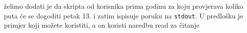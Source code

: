 \documentclass{exam}
\newcommand{\shell}[1]{\texttt{#1}}
\begin{document}
\begin{itemize}
                                                                        želimo
                                                                        dodati
                                                                        je da
                                                                        skripta
                                                                        od
                                                                        korisnika
                                                                        prima
                                                                        godinu
                                                                        za koju
                                                                        provjerava
                                                                        koliko
                                                                        puta će
                                                                        se
                                                                        dogoditi
                                                                        petak
                                                                        13. i
                                                                        zatim
                                                                        ispisuje
                                                                        poruku
                                                                        na
                                                                        \shell{stdout}.
                                                                        U
                                                                        predlošku
                                                                        je
                                                                        primjer
                                                                        koji
                                                                        možete
                                                                        koristiti,
                                                                        a on
                                                                        koristi
                                                                        naredbu
                                                                        read za
                                                                        čitanje

\end{itemize}
\end{document}
